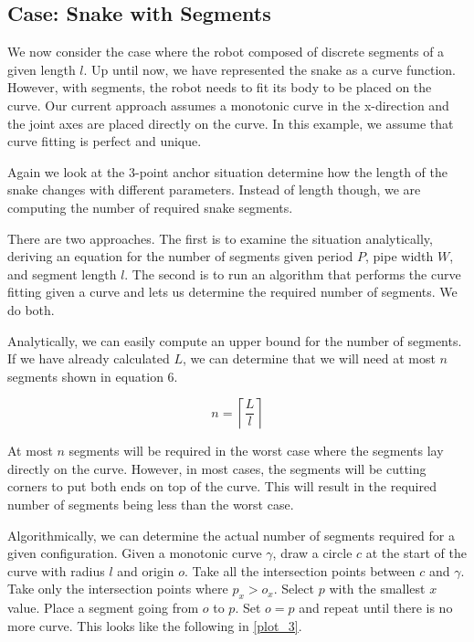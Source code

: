 \subsection{Case: Snake with Segments}
\label{case:snakewithsegments}

We now consider the case where the robot composed of discrete segments of a given length $l$. Up until now, we have represented the snake as a curve function. However, with segments, the robot needs to fit its body to be placed on the curve. Our current approach assumes a monotonic curve in the x-direction and the joint axes are placed directly on the curve. In this example, we assume that curve fitting is perfect and unique.

Again we look at the 3-point anchor situation determine how the length of the snake changes with different parameters. Instead of length though, we are computing the number of required snake segments.

There are two approaches. The first is to examine the situation analytically, deriving an equation for the number of segments given period $P$, pipe width $W$, and segment length $l$. The second is to run an algorithm that performs the curve fitting given a curve and lets us determine the required number of segments. We do both.

Analytically, we can easily compute an upper bound for the number of segments. If we have already calculated $L$, we can determine that we will need at most $n$ segments shown in equation 6.


\begin{equation}
n = \left \lceil \frac{L}{l} \right \rceil
\end{equation}


At most $n$ segments will be required in the worst case where the segments lay directly on the curve. However, in most cases, the segments will be cutting corners to put both ends on top of the curve. This will result in the required number of segments being less than the worst case.

Algorithmically, we can determine the actual number of segments required for a given configuration. Given a monotonic curve $\gamma$, draw a circle $c$ at the start of the curve with radius $l$ and origin $o$. Take all the intersection points between $c$ and $\gamma$. Take only the intersection points where $p_x > o_x$. Select $p$ with the smallest $x$ value. Place a segment going from $o$ to $p$. Set $o = p$ and repeat until there is no more curve. This looks like the following in \autoref{plot_3}.

